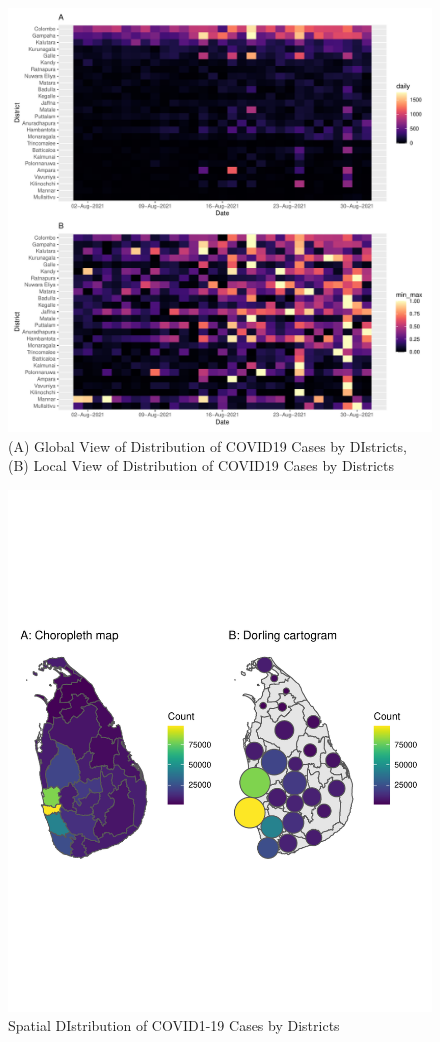 \documentclass[
]{article}
\begin{document}
\begin{figure}
\centering
\includegraphics{manuscript_covid19dashboard_files/figure-latex/unnamed-chunk-3-1.pdf}
\caption{(A) Global View of Distribution of COVID19 Cases by DIstricts,
(B) Local View of Distribution of COVID19 Cases by Districts}
\end{figure}

\begin{figure}
\centering
\includegraphics{manuscript_covid19dashboard_files/figure-latex/unnamed-chunk-4-1.pdf}
\caption{Spatial DIstribution of COVID1-19 Cases by Districts}
\end{figure}
\end{document}
